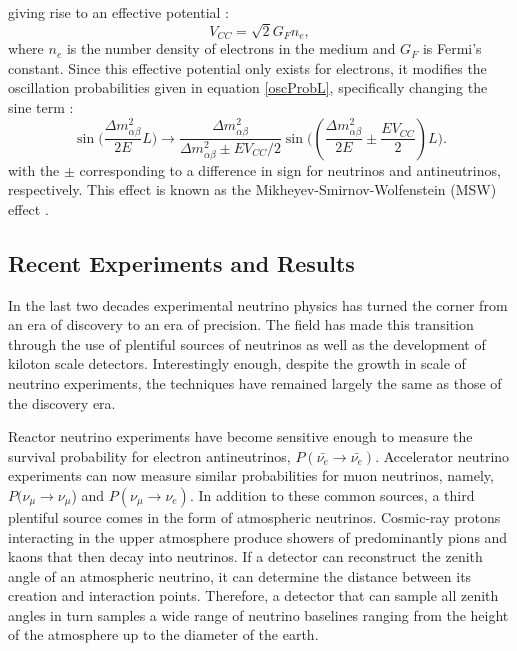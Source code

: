 giving rise to an effective potential \cite{ho2010elementary}:
\begin{equation}
\label{veff}
V_{CC} = \sqrt{2}G_F n_e,
\end{equation}
where $n_e$ is the number density of electrons in the medium and $G_F$ is
Fermi's constant.
Since this effective potential only exists for electrons, it modifies the
oscillation probabilities given in equation \eqref{oscProbL}, specifically
changing the sine term \cite{ho2010elementary}:
\begin{equation}
\label{modSin}
\sin\bigg(\frac{\Delta m_{\alpha\beta}^2}{2E}L\bigg) \rightarrow
\frac{\Delta m_{\alpha\beta}^2}{\Delta m_{\alpha\beta}^2 \pm E V_{CC}/2} \sin\bigg((\frac{\Delta m_{\alpha\beta}^2}{2E} \pm \frac{EV_{CC}}{2})L \bigg).
\end{equation}
with the $\pm$ corresponding to a difference in sign for neutrinos and
antineutrinos, respectively.
This effect is known as the Mikheyev-Smirnov-Wolfenstein (MSW) effect
\cite{wolfenstein1978neutrino}.

\subsection{Recent Experiments and Results}
In the last two decades experimental neutrino physics has turned the corner
from an era of discovery to an era of precision.
The field has made this transition through the use of plentiful sources of
neutrinos as well as the development of kiloton scale detectors.
Interestingly enough, despite the growth in scale of neutrino experiments, the
techniques have remained largely the same as those of the discovery era.

Reactor neutrino experiments \cite{kamland, dayaBay, reno} have become
sensitive enough to measure the survival probability for electron
antineutrinos, $P(\bar{\nu_e} \rightarrow \bar{\nu_e})$.
Accelerator neutrino experiments \cite{minos13,abe2014observation,nova2015nue}
can now
measure similar probabilities for muon neutrinos, namely,
$P(\nu_\mu \rightarrow \nu_\mu$) and $P(\nu_\mu \rightarrow \nu_e)$.
In addition to these common sources, a third plentiful source comes in the form
of atmospheric neutrinos.
Cosmic-ray protons interacting in the upper atmosphere produce showers of
predominantly pions and kaons that then decay into neutrinos.
If a detector can reconstruct the zenith angle of an atmospheric neutrino, it
can determine the distance between its creation and interaction points.
Therefore, a detector that can sample all zenith angles in turn samples a wide
range of neutrino baselines ranging from the height of the atmosphere up to the
diameter of the earth.

